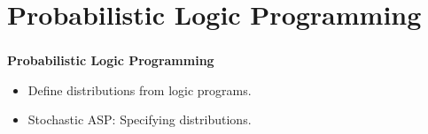 \documentclass[bigger,xcolor={x11names,svgnames}]{beamer}
\begin{document}
\section{Probabilistic Logic Programming}
%
%
\begin{frame}
    \frametitle{}
    \vfill
    \begin{center}
        {\huge\bf Probabilistic Logic Programming}
    \end{center}
    \vfill
    \begin{itemize}
        \item Define distributions from logic programs.
        \item Stochastic ASP: Specifying distributions.
    \end{itemize}
    \vfill
\end{frame}
%
\end{document}
